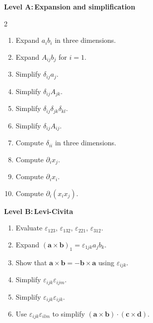 \documentclass{otscience}
\begin{document}
\begin{practicebox}
    \textbf{Level A:\,Expansion and simplification}
    \begin{multicols}{2}
        \begin{enumerate}
            \item Expand \(a_{i}b_i\) in three dimensions.
            \item Expand \(A_{ij}b_j\) for \(i=1\).
            \item Simplify \(\delta_{ij}a_j\).
            \item Simplify \(\delta_{ij}A_{jk}\).
            \item Simplify \(\delta_{ij}\delta_{jk}\delta_{kl}\).
            \item Simplify \(\delta_{ij}A_{ij}\).
            \item Compute \(\delta_{ii}\) in three dimensions.
            \item Compute \(\partial_i x_j\).
            \item Compute \(\partial_i x_i\).
            \item Compute \(\partial_i(x_{i}x_j)\).
        \end{enumerate}
    \end{multicols}

    \textbf{Level B:\,Levi-Civita}
    \begin{enumerate}
        \item Evaluate \(\varepsilon_{123}\), \(\varepsilon_{132}\), \(\varepsilon_{221}\), \(\varepsilon_{312}\).
        \item Expand \({(\mathbf{a}\times\mathbf{b})}_1=\varepsilon_{1jk}a_{j}b_k\).
        \item Show that \(\mathbf{a}\times\mathbf{b}=-\mathbf{b}\times\mathbf{a}\) using \(\varepsilon_{ijk}\).
        \item Simplify \(\varepsilon_{ijk}\varepsilon_{ijm}\).
        \item Simplify \(\varepsilon_{ijk}\varepsilon_{ijk}\).
        \item Use \(\varepsilon_{ijk}\varepsilon_{ilm}\) to simplify \((\mathbf{a}\times\mathbf{b})\cdot(\mathbf{c}\times\mathbf{d})\).
    \end{enumerate}


\end{practicebox}
\end{document}
